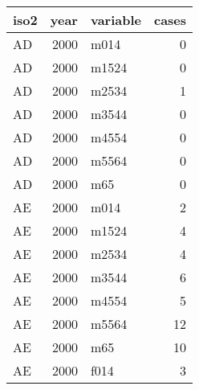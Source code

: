 \begin{tabular}{lrlr}
  \toprule
 iso2 & year & variable & cases \\ 
  \midrule
  AD & 2000 & m014 &   0 \\ 
  AD & 2000 & m1524 &   0 \\ 
  AD & 2000 & m2534 &   1 \\ 
  AD & 2000 & m3544 &   0 \\ 
  AD & 2000 & m4554 &   0 \\ 
  AD & 2000 & m5564 &   0 \\ 
  AD & 2000 & m65 &   0 \\ 
  AE & 2000 & m014 &   2 \\ 
  AE & 2000 & m1524 &   4 \\ 
  AE & 2000 & m2534 &   4 \\ 
  AE & 2000 & m3544 &   6 \\ 
  AE & 2000 & m4554 &   5 \\ 
  AE & 2000 & m5564 &  12 \\ 
  AE & 2000 & m65 &  10 \\ 
  AE & 2000 & f014 &   3 \\ 
   \bottomrule
\end{tabular}
